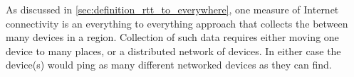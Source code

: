 As discussed in \cref{sec:definition_rtt_to_everywhere}, one measure of Internet connectivity is an everything to everything approach that collects the \rtt between many devices in a region. Collection of such data requires either moving one device to many places, or a distributed network of devices. In either case the device(s) would ping as many different networked devices as they can find.
